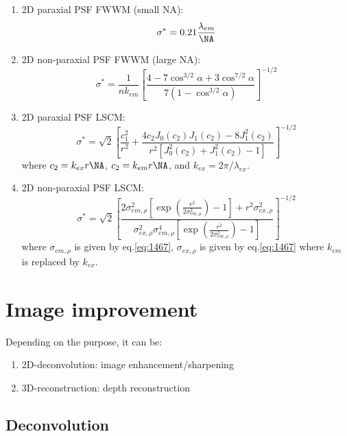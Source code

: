 \begin{enumerate}
  \item 2D paraxial PSF FWWM (small NA): \citep{thomann2002}
  \begin{equation}
  \sigma^* = 0.21 \frac{\lambda_{em}}{\NA}
  \end{equation}
  \item 2D non-paraxial PSF FWWM (large NA): 
  \begin{equation}
  \label{eq:1467}
  \sigma^* = \frac{1}{nk_{em}}\left[ \frac{4-7\cos^{3/2}\alpha +
  3\cos^{7/2}\alpha}{7\left(1-\cos^{3/2}\alpha \right)} \right]^{-1/2}
  \end{equation}
  
  \item 2D paraxial PSF LSCM:
  \begin{equation}
  \sigma^* = \sqrt{2} \left[ \frac{c_1^2}{r^2} +
  \frac{4c_2J_0(c_2)J_1(c_2)-8J_1^2(c_2)}{r^2 \left[J_0^2(c_2)+J_1^2(c_2)-1
  \right]} \right]^{-1/2}  
  \end{equation}
  where $c_2 = k_{ex}r\NA$, $c_2=k_{em}r\NA$, and $k_{ex}=2\pi/\lambda_{ex}$.
  
  \item 2D non-paraxial PSF LSCM: 
  \begin{equation}
  \sigma^* = \sqrt{2} \left[ 
  \frac{2\sigma^2_{em,\rho} \left[\exp(\frac{r^2}{2\sigma^2_{em,\rho}}) -1
  \right] + r^2 \sigma^2_{ex,\rho}}{\sigma^2_{ex,\rho}\sigma^4_{em,\rho}\left[
  \exp(\frac{r^2}{2\sigma^2_{em,\rho}}) -1 \right] } \right]^{-1/2}  
  \end{equation} 
  where $\sigma_{em,\rho}$ is given by eq.\ref{eq:1467}, $\sigma_{ex,\rho}$ is
  given by eq.\ref{eq:1467} where $k_{em}$ is replaced by $k_{ex}$.
\end{enumerate}




\section{Image improvement}

Depending on the purpose, it can be:
\begin{enumerate}
  \item 2D-deconvolution: image enhancement/sharpening
  \item 3D-reconstruction: depth reconstruction
\end{enumerate}


\subsection{Deconvolution}
 
